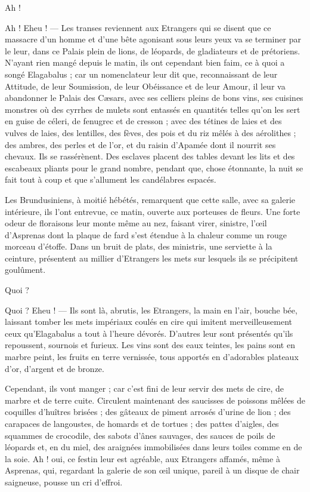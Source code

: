 \documentclass[a4paper, 11pt, oneside, polutonikogreek, french]{article}
\begin{document}
Ah !

Ah ! Eheu ! --- Les transes reviennent aux Etrangers qui se disent que ce massacre d'un homme et d'une bête agonisant sous leurs yeux va se terminer par le leur, dans ce Palais plein de lions, de léopards, de gladiateurs et de prétoriens. N'ayant rien mangé depuis le matin, ils ont cependant bien faim, ce à quoi a songé Elagabalus ; car un nomenclateur leur dit que, reconnaissant de leur Attitude, de leur Soumission, de leur Obéissance et de leur Amour, il leur va abandonner le Palais des Cæsars, avec ses celliers pleins de bons vins, ses cuisines monstres où des cyrrhes de mulets sont entassés en quantités telles qu'on les sert en guise de céleri, de fenugrec et de cresson ; avec des tétines de laies et des vulves de laies, des lentilles, des fèves, des pois et du riz mêlés à des aérolithes ; des ambres, des perles et de l'or, et du raisin d'Apamée dont il nourrit ses chevaux. Ils se rassérènent. Des esclaves placent des tables devant les lits et des escabeaux pliants pour le grand nombre, pendant que, chose étonnante, la nuit se fait tout à coup et que s'allument les candélabres espacés.

Les Brundusiniens, à moitié hébétés, remarquent que cette salle, avec sa galerie intérieure, ils l'ont entrevue, ce matin, ouverte aux porteuses de fleurs. Une forte odeur de floraisons leur monte même au nez, faisant virer, sinistre, l'œil d'Asprenas dont la plaque de fard s'est étendue à la chaleur comme un rouge morceau d'étoffe. Dans un bruit de plats, des ministris, une serviette à la ceinture, présentent au millier d'Etrangers les mets sur lesquels ils se précipitent goulûment.

Quoi ?

Quoi ? Eheu ! --- Ils sont là, abrutis, les Etrangers, la main en l'air, bouche bée, laissant tomber les mets impériaux coulés en cire qui imitent merveilleusement ceux qu'Elagabalus a tout à l'heure dévorés. D'autres leur sont présentés qu'ils repoussent, sournois et furieux. Les vins sont des eaux teintes, les pains sont en marbre peint, les fruits en terre vernissée, tous apportés en d'adorables plateaux d'or, d'argent et de bronze.

Cependant, ils vont manger ; car c'est fini de leur servir des mets de cire, de marbre et de terre cuite. Circulent maintenant des saucisses de poissons mêlées de coquilles d'huîtres brisées ; des gâteaux de piment arrosés d'urine de lion ; des carapaces de langoustes, de homards et de tortues ; des pattes d'aigles, des squammes de crocodile, des sabots d'ânes sauvages, des sauces de poils de léopards et, en du miel, des araignées immobilisées dans leurs toiles comme en de la soie. Ah ! oui, ce festin leur est agréable, aux Etrangers affamés, même à Asprenas, qui, regardant la galerie de son œil unique, pareil à un disque de chair saigneuse, pousse un cri d'effroi.
\end{document}
